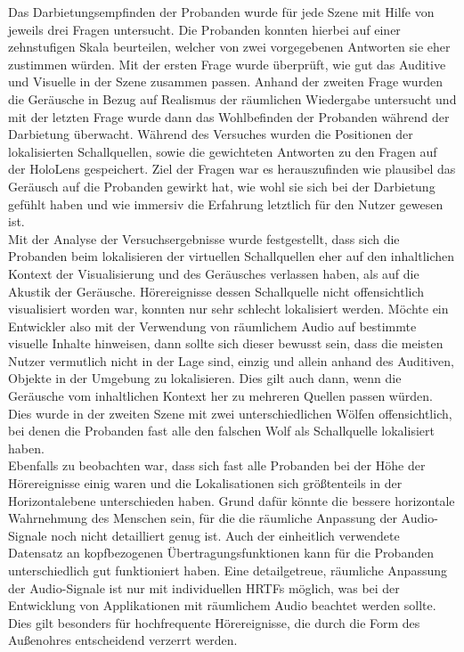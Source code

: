 Das Darbietungsempfinden der Probanden wurde für jede Szene mit Hilfe von jeweils drei Fragen untersucht. Die Probanden konnten hierbei auf einer zehnstufigen Skala beurteilen, welcher von zwei vorgegebenen Antworten sie eher zustimmen würden. Mit der ersten Frage wurde überprüft, wie gut das Auditive und Visuelle in der Szene zusammen passen. Anhand der zweiten Frage wurden die  Geräusche in Bezug auf Realismus der räumlichen Wiedergabe  untersucht und mit der letzten Frage wurde dann das Wohlbefinden der Probanden während der Darbietung überwacht. Während des Versuches wurden die Positionen der lokalisierten Schallquellen, sowie die gewichteten Antworten zu den Fragen auf der HoloLens gespeichert. Ziel der Fragen war es herauszufinden wie plausibel das Geräusch auf die Probanden gewirkt hat, wie wohl sie sich bei der Darbietung gefühlt haben und wie immersiv die Erfahrung letztlich für den Nutzer gewesen ist. \\

Mit der Analyse der Versuchsergebnisse wurde festgestellt, dass sich die Probanden beim lokalisieren der virtuellen Schallquellen eher auf den inhaltlichen Kontext der Visualisierung und des Geräusches verlassen haben, als auf die Akustik der Geräusche. Hörereignisse dessen Schallquelle nicht offensichtlich visualisiert worden war, konnten nur sehr schlecht lokalisiert werden. Möchte ein Entwickler also mit der Verwendung von räumlichem Audio auf bestimmte visuelle Inhalte hinweisen, dann sollte sich dieser bewusst sein, dass die meisten Nutzer vermutlich nicht in der Lage sind, einzig und allein anhand des Auditiven, Objekte in der Umgebung zu lokalisieren. Dies gilt auch dann, wenn die Geräusche vom inhaltlichen Kontext her zu mehreren Quellen passen würden. Dies wurde in der zweiten Szene mit zwei unterschiedlichen Wölfen offensichtlich, bei denen die Probanden fast alle den falschen Wolf als Schallquelle lokalisiert haben. \\

Ebenfalls zu beobachten war, dass sich fast alle Probanden bei der Höhe der Hörereignisse einig waren und die Lokalisationen sich größtenteils in der Horizontalebene unterschieden haben. Grund dafür könnte die bessere horizontale Wahrnehmung des Menschen sein, für die die räumliche Anpassung der Audio-Signale noch nicht detailliert genug ist. Auch der einheitlich verwendete Datensatz an kopfbezogenen Übertragungsfunktionen kann für die Probanden unterschiedlich gut funktioniert haben. Eine detailgetreue, räumliche Anpassung der Audio-Signale ist nur mit individuellen HRTFs möglich, was bei der Entwicklung von Applikationen mit räumlichem Audio beachtet werden sollte. Dies gilt besonders für hochfrequente Hörereignisse, die durch die Form des Außenohres entscheidend verzerrt werden. \\

